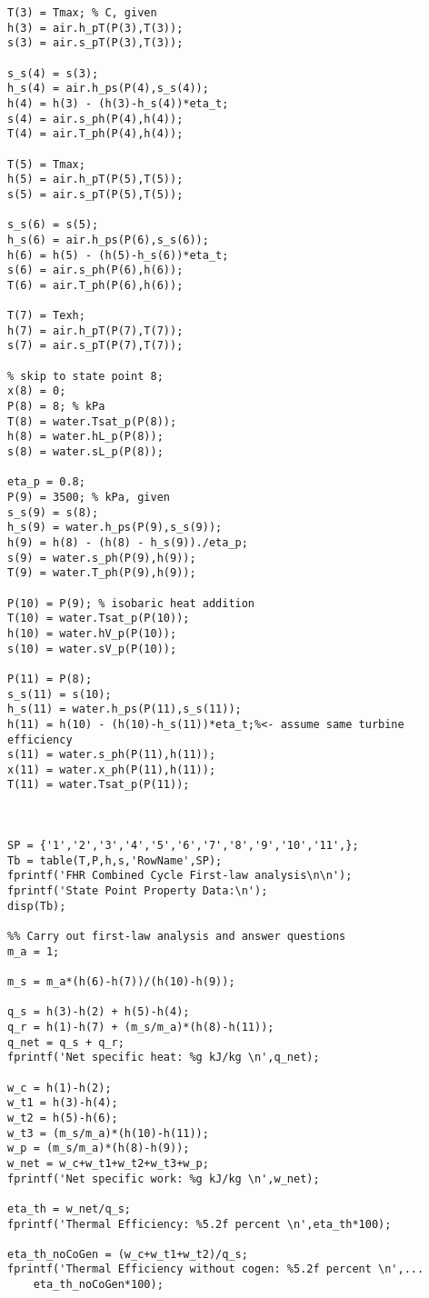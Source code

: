\begin{fullwidth}
\begin{lstlisting}
T(3) = Tmax; % C, given
h(3) = air.h_pT(P(3),T(3));
s(3) = air.s_pT(P(3),T(3));

s_s(4) = s(3);
h_s(4) = air.h_ps(P(4),s_s(4));
h(4) = h(3) - (h(3)-h_s(4))*eta_t;
s(4) = air.s_ph(P(4),h(4));
T(4) = air.T_ph(P(4),h(4));

T(5) = Tmax;
h(5) = air.h_pT(P(5),T(5));
s(5) = air.s_pT(P(5),T(5));

s_s(6) = s(5);
h_s(6) = air.h_ps(P(6),s_s(6));
h(6) = h(5) - (h(5)-h_s(6))*eta_t;
s(6) = air.s_ph(P(6),h(6));
T(6) = air.T_ph(P(6),h(6));

T(7) = Texh; 
h(7) = air.h_pT(P(7),T(7));
s(7) = air.s_pT(P(7),T(7));

% skip to state point 8;
x(8) = 0;
P(8) = 8; % kPa
T(8) = water.Tsat_p(P(8));
h(8) = water.hL_p(P(8));
s(8) = water.sL_p(P(8));

eta_p = 0.8;
P(9) = 3500; % kPa, given
s_s(9) = s(8);
h_s(9) = water.h_ps(P(9),s_s(9));
h(9) = h(8) - (h(8) - h_s(9))./eta_p;
s(9) = water.s_ph(P(9),h(9));
T(9) = water.T_ph(P(9),h(9));

P(10) = P(9); % isobaric heat addition
T(10) = water.Tsat_p(P(10));
h(10) = water.hV_p(P(10));
s(10) = water.sV_p(P(10));

P(11) = P(8);
s_s(11) = s(10);
h_s(11) = water.h_ps(P(11),s_s(11));
h(11) = h(10) - (h(10)-h_s(11))*eta_t;%<- assume same turbine efficiency
s(11) = water.s_ph(P(11),h(11));
x(11) = water.x_ph(P(11),h(11));
T(11) = water.Tsat_p(P(11));



SP = {'1','2','3','4','5','6','7','8','9','10','11',};
Tb = table(T,P,h,s,'RowName',SP); 
fprintf('FHR Combined Cycle First-law analysis\n\n');
fprintf('State Point Property Data:\n');
disp(Tb);

%% Carry out first-law analysis and answer questions
m_a = 1;

m_s = m_a*(h(6)-h(7))/(h(10)-h(9));

q_s = h(3)-h(2) + h(5)-h(4);
q_r = h(1)-h(7) + (m_s/m_a)*(h(8)-h(11));
q_net = q_s + q_r;
fprintf('Net specific heat: %g kJ/kg \n',q_net);

w_c = h(1)-h(2);
w_t1 = h(3)-h(4);
w_t2 = h(5)-h(6);
w_t3 = (m_s/m_a)*(h(10)-h(11));
w_p = (m_s/m_a)*(h(8)-h(9));
w_net = w_c+w_t1+w_t2+w_t3+w_p;
fprintf('Net specific work: %g kJ/kg \n',w_net);

eta_th = w_net/q_s;
fprintf('Thermal Efficiency: %5.2f percent \n',eta_th*100);

eta_th_noCoGen = (w_c+w_t1+w_t2)/q_s;
fprintf('Thermal Efficiency without cogen: %5.2f percent \n',...
    eta_th_noCoGen*100);



\end{lstlisting}
\end{fullwidth}
